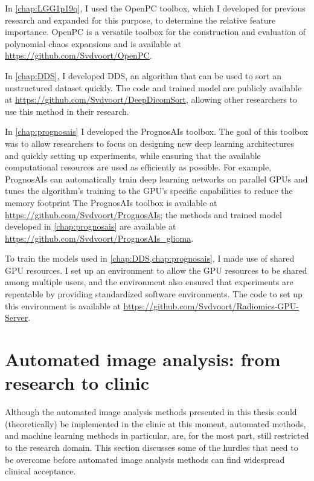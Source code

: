 In \cref{chap:LGG1p19q}, I used the OpenPC toolbox, which I developed for previous research and expanded for this purpose, to determine the relative feature importance.
OpenPC is a versatile toolbox for the construction and evaluation of polynomial chaos expansions and is available at \url{https://github.com/Svdvoort/OpenPC}.

In \cref{chap:DDS}, I developed \acrlong{DDS}, an algorithm that can be used to sort an unstructured dataset quickly.
The code and trained model are publicly available at \url{https://github.com/Svdvoort/DeepDicomSort}, allowing other researchers to use this method in their research.


In \cref{chap:prognosais} I developed the PrognosAIs toolbox.
The goal of this toolbox was to allow researchers to focus on designing new deep learning architectures and quickly setting up experiments, while ensuring that the available computational resources are used as efficiently as possible.
For example, PrognosAIs can automatically train deep learning networks on parallel GPUs and tunes the algorithm's training to the GPU's specific capabilities to reduce the memory footprint
The PrognosAIs toolbox is available at \url{https://github.com/Svdvoort/PrognosAIs}; the methods and trained model developed in \cref{chap:prognosais} are available at \url{https://github.com/Svdvoort/PrognosAIs_glioma}.

To train the models used in \cref{chap:DDS,chap:prognosais}, I made use of shared GPU resources.
I set up an environment to allow the GPU resources to be shared among multiple users, and the environment also ensured that experiments are repeatable by providing standardized software environments.
The code to set up this environment is available at \url{https://github.com/Svdvoort/Radiomics-GPU-Server}.




\section{Automated image analysis: from research to clinic}\label{sec:discussion_clinical}

Although the automated image analysis methods presented in this thesis could (theoretically) be implemented in the clinic at this moment, automated methods, and machine learning methods in particular, are, for the most part, still restricted to the research domain.
This section discusses some of the hurdles that need to be overcome before automated image analysis methods can find widespread clinical acceptance.

